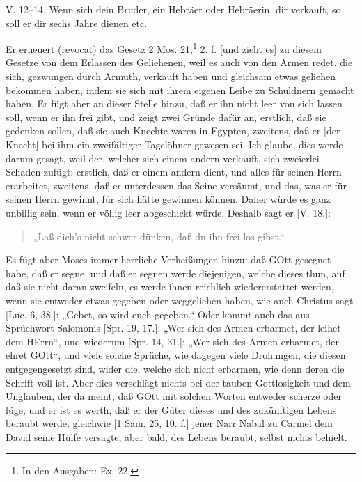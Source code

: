 \begin{schriftzitat}
V. 12–14. Wenn sich dein Bruder, ein Hebräer oder Hebräerin, dir verkauft, so soll er dir sechs Jahre dienen etc.
\end{schriftzitat}

Er erneuert (revocat) das Gesetz 2 Mos. 21,\footnote{In den Ausgaben: Ex. 22.} 2. f. [und zieht es] zu diesem Gesetze von dem Erlassen des Geliehenen, weil es auch von den Armen redet, die sich, gezwungen durch Armuth, verkauft haben und gleichsam etwas geliehen bekommen haben, indem sie sich mit ihrem eigenen Leibe zu Schuldnern gemacht haben. Er fügt aber an dieser Stelle hinzu, daß er ihn nicht leer von sich lassen soll, wenn er ihn frei gibt, und zeigt zwei Gründe dafür an, erstlich, daß sie gedenken sollen, daß sie auch Knechte waren in Egypten, zweitens, daß er [der Knecht] bei ihm ein zweifältiger Tagelöhner gewesen sei. Ich glaube, dies werde darum gesagt, weil der, welcher sich einem andern verkauft, sich zweierlei Schaden zufügt: erstlich, daß er einem andern dient, und alles für seinen Herrn erarbeitet, zweitens, daß er unterdessen das Seine versäumt, und das, was er für seinen Herrn gewinnt, für sich hätte gewinnen können. Daher würde es ganz unbillig sein, wenn er völlig leer abgeschickt würde. Deshalb sagt er [V. 18.]:

\begin{quote}
„Laß dich’s nicht schwer dünken, daß du ihn frei los gibst.“
\end{quote}

Es fügt aber Moses immer herrliche Verheißungen hinzu: daß GOtt gesegnet habe, daß er segne, und daß er segnen werde diejenigen, welche dieses thun, auf daß sie nicht daran zweifeln, es werde ihnen reichlich wiedererstattet werden, wenn sie entweder etwas gegeben oder weggeliehen haben, wie auch Christus sagt [Luc. 6, 38.]: „Gebet, so wird euch gegeben.“ Oder kommt auch das aus Sprüchwort Salomonis [Spr. 19, 17.]: „Wer sich des Armen erbarmet, der leihet dem HErrn“, und wiederum [Spr. 14, 31.]: „Wer sich des Armen erbarmet, der ehret GOtt“, und viele solche Sprüche, wie dagegen viele Drohungen, die diesen entgegengesetzt sind, wider die, welche sich nicht erbarmen, wie denn deren die Schrift voll ist. Aber dies verschlägt nichts bei der tauben Gottlosigkeit und dem Unglauben, der da meint, daß GOtt mit solchen Worten entweder scherze oder lüge, und er ist es werth, daß er der Güter dieses und des zukünftigen Lebens beraubt werde, gleichwie [1 Sam. 25, 10. f.] jener Narr Nabal zu Carmel dem David seine Hülfe versagte, aber bald, des Lebens beraubt, selbst nichts behielt.

